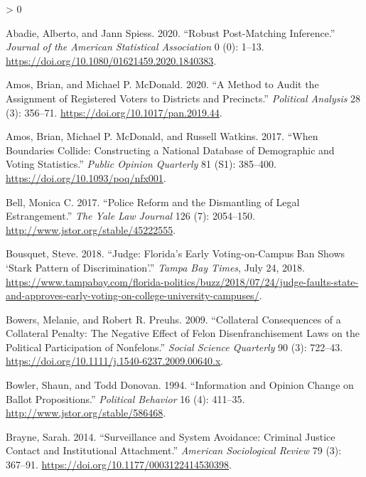 \documentclass[
  12pt,
]{article}
\newlength{\cslhangindent}
\newenvironment{CSLReferences}[2] %
 {%
  \setlength{\parindent}{0pt}
  \ifodd #1 \everypar{\setlength{\hangindent}{\cslhangindent}}\ignorespaces\fi
  \ifnum #2 > 0
  \setlength{\parskip}{#2\baselineskip}
  \fi
 }%
 {}
\begin{document}
\hypertarget{refs}{}
\begin{CSLReferences}{1}{0}
\leavevmode\hypertarget{ref-Abadie2020}{}%
Abadie, Alberto, and Jann Spiess. 2020. {``Robust {Post}-{Matching Inference}.''} \emph{Journal of the American Statistical Association} 0 (0): 1--13. \url{https://doi.org/10.1080/01621459.2020.1840383}.

\leavevmode\hypertarget{ref-Amos2020}{}%
Amos, Brian, and Michael P. McDonald. 2020. {``A {Method} to {Audit} the {Assignment} of {Registered Voters} to {Districts} and {Precincts}.''} \emph{Political Analysis} 28 (3): 356--71. \url{https://doi.org/10.1017/pan.2019.44}.

\leavevmode\hypertarget{ref-Amos2017}{}%
Amos, Brian, Michael P. McDonald, and Russell Watkins. 2017. {``When {Boundaries Collide: Constructing} a {National Database} of {Demographic} and {Voting Statistics}.''} \emph{Public Opinion Quarterly} 81 (S1): 385--400. \url{https://doi.org/10.1093/poq/nfx001}.

\leavevmode\hypertarget{ref-Bell2017}{}%
Bell, Monica C. 2017. {``Police {Reform} and the {Dismantling} of {Legal Estrangement}.''} \emph{The Yale Law Journal} 126 (7): 2054--150. \url{http://www.jstor.org/stable/45222555}.

\leavevmode\hypertarget{ref-Bousquet2018a}{}%
Bousquet, Steve. 2018. {``Judge: {Florida}'s Early Voting-on-Campus Ban Shows {`Stark Pattern of Discrimination'}.''} \emph{Tampa Bay Times}, July 24, 2018. \url{https://www.tampabay.com/florida-politics/buzz/2018/07/24/judge-faults-state-and-approves-early-voting-on-college-university-campuses/}.

\leavevmode\hypertarget{ref-Bowers2009}{}%
Bowers, Melanie, and Robert R. Preuhs. 2009. {``Collateral {Consequences} of a {Collateral Penalty}: {The Negative Effect} of {Felon Disenfranchisement Laws} on the {Political Participation} of {Nonfelons}.''} \emph{Social Science Quarterly} 90 (3): 722--43. \url{https://doi.org/10.1111/j.1540-6237.2009.00640.x}.

\leavevmode\hypertarget{ref-Bowler1994}{}%
Bowler, Shaun, and Todd Donovan. 1994. {``Information and {Opinion Change} on {Ballot Propositions}.''} \emph{Political Behavior} 16 (4): 411--35. \url{http://www.jstor.org/stable/586468}.

\leavevmode\hypertarget{ref-Brayne2014}{}%
Brayne, Sarah. 2014. {``Surveillance and {System Avoidance}: {Criminal Justice Contact} and {Institutional Attachment}.''} \emph{American Sociological Review} 79 (3): 367--91. \url{https://doi.org/10.1177/0003122414530398}.


\end{CSLReferences}
\end{document}
